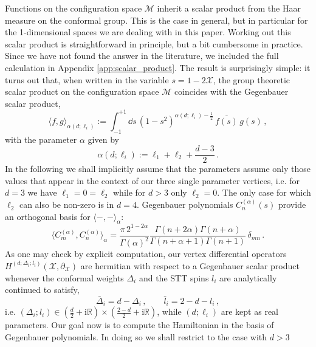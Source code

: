 \documentclass{article}
\def \Dg {\Delta}
\def \dg {\delta}
\def \ds {\partial}
\def \ag {\alpha}
\def \Rs {\mathbb{R}}
\begin{document}
Functions on the configuration space $\mathcal{M}$ inherit a scalar product 
from the Haar measure on the conformal group. This is the case in general, but in 
particular for the 1-dimensional spaces we are dealing with in this paper. Working 
out this scalar product is straightforward in principle, but a bit cumbersome in 
practice. Since we have not found the answer in the literature, we included the full 
calculation in Appendix \ref{app:scalar_product}. The result is surprisingly simple: 
it turns out that, when written in the variable $s=1-2\mathcal{X}$, the group theoretic 
scalar product on the configuration space $\mathcal{M}$ coincides with 
the Gegenbauer scalar product, 
\begin{equation}
\langle f, g \rangle_{\ag(d;\ell_i)} :=  \int_{-1}^{+1} \dd s \, (1-s^2)^{\ag(d;\ell_i)- 
\frac{1}{2}} \, \overline{f(s)} \, g(s)\, ,  
\label{GegSP}
\end{equation}
with the parameter $\alpha$ given by 
\begin{equation}  \label{eq:alpha}
\ag(d;\ell_i) := \ell_1+\ell_2+\frac{d-3}{2}\,.
\end{equation} 
In the following we shall implicitly assume that the parameters assume only those 
values that appear in the context of our three single parameter vertices, i.e. for $d=3$
we have $\ell_1 = 0 = \ell_2$ while for $d > 3$ only $\ell_2 = 0$. The only case for 
which $\ell_2$ can also be non-zero is in $d=4$. Gegenbauer polynomials $C_n^{(\ag)} 
(s)$ provide an orthogonal basis for $\langle -, - \rangle_{\ag}$:
\begin{equation}
\langle C_m^{(\ag)}, C_n^{(\ag)} \rangle_{\ag} = \frac{\pi\, 2^{1-2\ag} }{\Gamma (\ag)^2} 
\frac{\Gamma (n+2 \ag)  \Gamma (n+\ag)}{\Gamma(n+\ag+1) \Gamma(n+1)} \, \dg_{mn}\,. \label{normGeg}
\end{equation}
As one may check by explicit computation, our vertex differential operators $H^{(d;\Dg_i;l_i)}
(\mathcal{X}, \ds_{\mathcal{X}})$ are hermitian with respect to a Gegenbauer scalar product 
whenever the conformal weights $\Dg_i$ and the STT spins $l_i$ are analytically continued to satisfy,
\begin{equation} \label{conjugation} 
\bar{\Dg}_i = d- \Dg_i\,, \qquad \bar{l}_i = 2-d-l_i\,,
\end{equation}
i.e. $(\Dg_i;l_i) \in \left(\frac{d}{2} + \mathrm{i} \Rs \right) \times \left(\frac{2-d}{2}+\mathrm{i} \Rs \right)$, while $(d;\ell_i)$ are kept as real parameters. Our goal now is to compute the Hamiltonian 
in the basis of Gegenbauer polynomials. In doing so we shall restrict to the case with $d>3$ 
\end{document}

